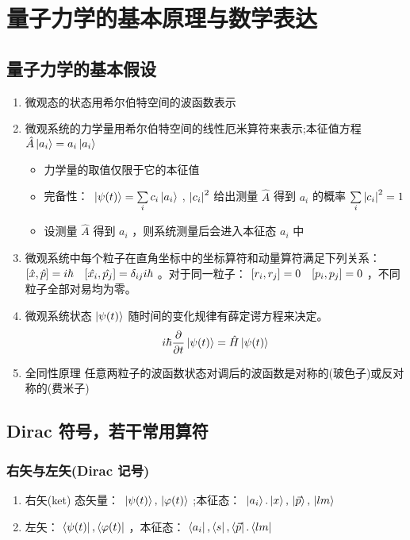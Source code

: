 \chapter{量子力学的基本原理与数学表达}

\section{量子力学的基本假设}
\begin{enumerate}
    \item 微观态的状态用希尔伯特空间的波函数表示
    \item 微观系统的力学量用希尔伯特空间的线性厄米算符来表示;本征值方程 \( \hat{A}\ket{a_i}=a_i\ket{a_i} \) \begin{itemize}
        \item 力学量的取值仅限于它的本征值
        \item 完备性： \( \ket*{\psi(t)}=\sum\limits_{i}^{}c_i\ket*{a_i} \) , \( \qty|c_i|^2 \) 给出测量 \( \hat{A} \) 得到 \( a_i \) 的概率 \( \sum\limits_{i}^{}\qty|c_i|^2=1 \) 
        \item 设测量 \( \hat{A} \) 得到 \( a_i \) ，则系统测量后会进入本征态 \( a_i \) 中
    \end{itemize}
    \item 微观系统中每个粒子在直角坐标中的坐标算符和动量算符满足下列关系： \( \qty[\hat{x},\hat{p}]=i\hbar \quad \qty[\hat{x_i},\hat{p_j}]=\delta_{ij}i\hbar \) 。对于同一粒子： \( \qty[r_i,r_j]=0 \quad \qty[p_i,p_j]=0 \) ，不同粒子全部对易均为零。
    \item 微观系统状态 \( \ket{\psi(t)} \) 随时间的变化规律有薛定谔方程来决定。
    \[
        i\hbar\pderivative{t}\ket{\psi(t)}=\hat{H}\ket{\psi(t)}
    \]
    \item 全同性原理 任意两粒子的波函数状态对调后的波函数是对称的(玻色子)或反对称的(费米子)
\end{enumerate}

\section{Dirac 符号，若干常用算符}
\subsection{右矢与左矢(Dirac 记号)}

\begin{enumerate}
    \item 右矢(ket) 态矢量： \( \ket*{\psi(t)},\ket*{\varphi(t)} \) ;本征态： \( \ket*{a_i}.\ket*{x},\ket*{\vec{p}},\ket*{lm} \) 
    \item 左矢： \( \bra{\psi(t)},\bra{\varphi(t)} \) ，本征态： \( \bra{a_i},\bra{s},\bra{\vec{p}}.\bra{lm} \) 
\end{enumerate}

